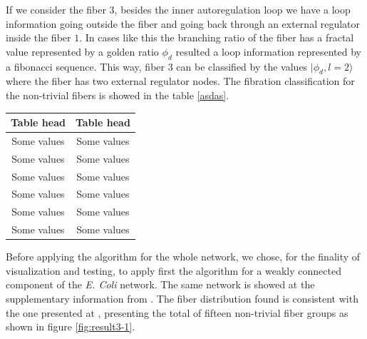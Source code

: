 \documentclass[12pt]{diazessay} %
\begin{document}
If we consider the fiber $3$, besides the inner autoregulation loop we have a loop information going outside the fiber and going back through an external regulator inside the fiber $1$. In cases like this the branching ratio of the fiber has a fractal value represented by a golden ratio $\phi_d$ resulted a loop information represented by a fibonacci sequence. This way, fiber $3$ can be classified by the values $| \phi_d, l = 2 \rangle$ where the fiber has two external regulator nodes. The fibration classification for the non-trivial fibers is showed in the table \ref{asdas}.

\begin{table}
\centering
\begin{tabular}[b]{cc}\hline
	Table head & Table head \\ \hline
	Some values & Some values \\
	Some values & Some values \\
	Some values & Some values \\
	Some values & Some values \\
	Some values & Some values \\
	Some values & Some values \\ \hline
  \end{tabular}
\end{table}

Before applying the algorithm for the whole network, we chose, for the finality of visualization and testing, to apply first the algorithm for a weakly connected component of the \textit{E. Coli} network. The same network is showed at the supplementary information from \cite{fibration2019}. The fiber distribution found is consistent with the one presented at \cite{fibration2019}, presenting the total of fifteen non-trivial fiber groups as shown in figure \ref{fig:result3-1}.
\end{document}
